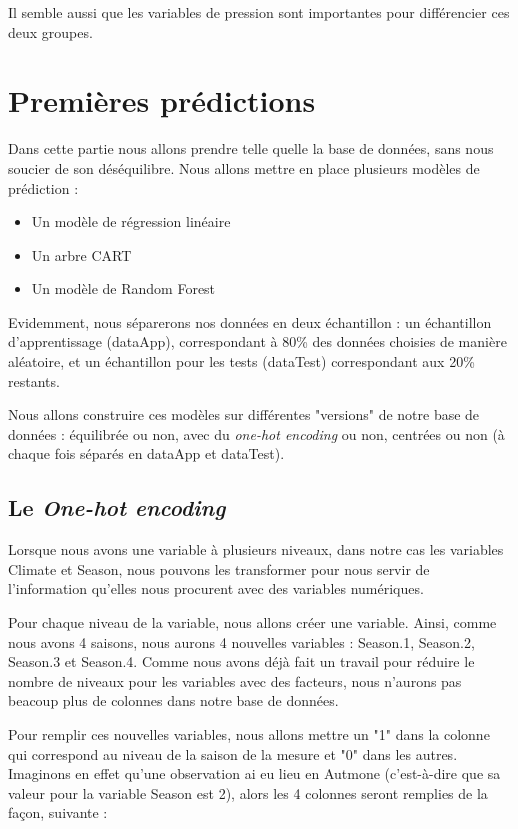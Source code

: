 \documentclass{article}
\begin{document}
Il semble aussi que les variables de pression sont importantes pour différencier ces deux groupes. 

\section{Premières prédictions}

Dans cette partie nous allons prendre telle quelle la base de données, sans nous soucier de son déséquilibre. Nous allons mettre en place plusieurs modèles de prédiction : 

\begin{itemize}
    \item Un modèle de régression linéaire
    \item Un arbre CART
    \item Un modèle de Random Forest
\end{itemize}

Evidemment, nous séparerons nos données en deux échantillon : un échantillon d'apprentissage (dataApp), correspondant à 80\% des données choisies de manière aléatoire, et un échantillon pour les tests (dataTest) correspondant aux 20\% restants.

Nous allons construire ces modèles sur différentes "versions" de notre base de données : équilibrée ou non, avec du \emph{one-hot encoding} ou non, centrées ou non (à chaque fois séparés en dataApp et dataTest). 

\subsection{Le \emph{One-hot encoding}}

Lorsque nous avons une variable à plusieurs niveaux, dans notre cas les variables Climate et Season, nous pouvons les transformer pour nous servir de l'information qu'elles nous procurent avec des variables numériques. 

Pour chaque niveau de la variable, nous allons créer une variable. Ainsi, comme nous avons 4 saisons, nous aurons 4 nouvelles variables : Season.1, Season.2, Season.3 et Season.4. Comme nous avons déjà fait un travail pour réduire le nombre de niveaux pour les variables avec des facteurs, nous n'aurons pas beacoup plus de colonnes dans notre base de données. 

Pour remplir ces nouvelles variables, nous allons mettre un "1" dans la colonne qui correspond au niveau de la saison de la mesure et "0" dans les autres. Imaginons en effet qu'une observation ai eu lieu en Autmone (c'est-à-dire que sa valeur pour la variable Season est 2), alors les 4 colonnes seront remplies de la façon, suivante : 
\end{document}
